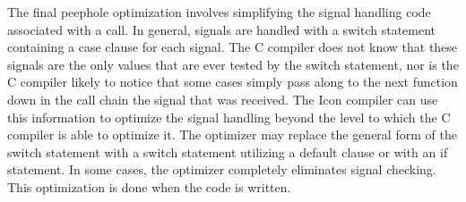 The final peephole optimization involves simplifying the signal
handling code associated with a call. In general, signals are handled
with a switch statement containing a case clause for each signal. The
C compiler does not know that these signals are the only values that
are ever tested by the switch statement, nor is the C compiler likely
to notice that some cases simply pass along to the next function down
in the call chain the signal that was received. The Icon compiler can
use this information to optimize the signal handling beyond the level
to which the C compiler is able to optimize it. The optimizer may
replace the general form of the switch statement with a switch
statement utilizing a default clause or with an if statement. In some
cases, the optimizer completely eliminates signal checking. This
optimization is done when the code is written.


